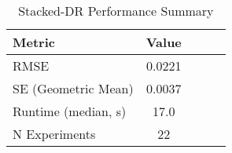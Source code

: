 \begin{table}[htbp]
\centering
\caption{Stacked-DR Performance Summary}
\label{tab:stacking}
\begin{tabular}{l|cccc}
\toprule
Metric & Value \\
\midrule
RMSE & 0.0221 \\
SE (Geometric Mean) & 0.0037 \\
Runtime (median, s) & 17.0 \\
N Experiments & 22 \\
\bottomrule
\end{tabular}
\end{table}